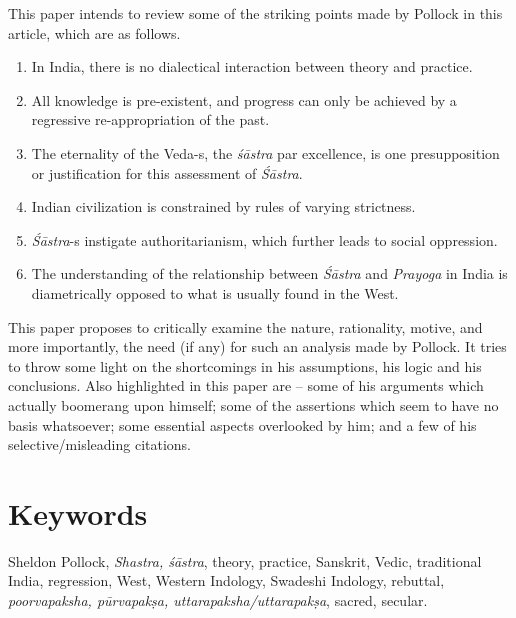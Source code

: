 This paper intends to review some of the striking points made by Pollock in this article, which are as follows.
\begin{enumerate}
\itemsep=1pt
\item In India, there is no dialectical interaction between theory and practice.

\item All knowledge is pre-existent, and progress can only be achieved by a regressive re-appropriation of the past.

\item The eternality of the Veda-s, the {\it śāstra} par excellence, is one presupposition or justification for this assessment of {\it Śāstra}.

\item Indian civilization is constrained by rules of varying strictness.

\item {\it Śāstra}-s instigate authoritarianism, which further leads to social oppression.

\item The understanding of the relationship between {\it Śāstra} and {\it Prayoga} in India is  diametrically opposed to what is usually found in the West. 
\end{enumerate}

This paper proposes to critically examine the nature, rationality, motive, and more importantly, the need (if any) for such an analysis made by Pollock. It tries to throw some light on the shortcomings in his assumptions, his logic and his conclusions. Also highlighted in this paper are -- some of his arguments which actually boomerang upon himself; some of the assertions which seem to have no basis whatsoever; some essential aspects overlooked by him; and a few of his selective/misleading citations.

\vskip -12pt

\section*{Keywords}

Sheldon Pollock, \textsl{Shastra, śāstra}, theory, practice, Sanskrit, Vedic, traditional India, regression, West, Western Indology, Swadeshi Indology, rebuttal, \textsl{poorvapaksha, pūrvapakṣa, uttarapaksha/uttarapakṣa}, sacred, secular.

